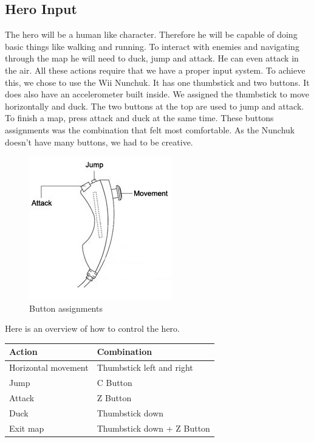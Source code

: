 \subsection{Hero Input} %
The hero will be a human like character. Therefore he will be capable of doing basic things like walking and running. To interact with enemies and navigating through the map he will need to duck, jump and attack. He can even attack in the air. All these actions require that we have a proper input system.
\newline
To achieve this, we chose to use the Wii Nunchuk. It has one thumbstick and two buttons. It does also have an accelerometer built inside. We assigned the thumbstick to move horizontally and duck. The two buttons at the top are used to jump and attack. To finish a map, press attack and duck at the same time.
\newline
These buttons assignments was the combination that felt most comfortable. As the Nunchuk doesn't have many buttons, we had to be creative.

\begin{figure}[H]
  \centering
  \includegraphics[scale=0.6]{Figures/nunchuk}
  \caption{Button assignments}
  \label{fig:Nunchuk}
\end{figure}

Here is an overview of how to control the hero.

\begin{table}[H]
    \centering
    \begin{tabular}{ll}
    Action               & Combination                \\ \hline
    Horizontal movement  & Thumbstick left and right  \\
    Jump                 & C Button                   \\
    Attack               & Z Button                   \\
    Duck                 & Thumbstick down            \\
    Exit map             & Thumbstick down + Z Button \\
    \end{tabular}
\end{table}


